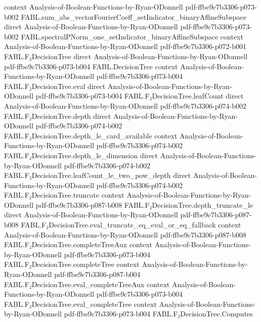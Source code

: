 \begin{theorem}
  {context}
  {Analysis-of-Boolean-Functions-by-Ryan-ODonnell}
  {pdf-ffbe9c7b3306-p073-b002}
\proofstep
  {FABL.sum_abs_vectorFourierCoeff_setIndicator_binaryAffineSubspace}
  {direct}
  {Analysis-of-Boolean-Functions-by-Ryan-ODonnell}
  {pdf-ffbe9c7b3306-p073-b002}
\proofstep
  {FABL.spectralPNorm_one_setIndicator_binaryAffineSubspace}
  {context}
  {Analysis-of-Boolean-Functions-by-Ryan-ODonnell}
  {pdf-ffbe9c7b3306-p072-b001}
\proofstep
  {FABL.F₂DecisionTree}
  {direct}
  {Analysis-of-Boolean-Functions-by-Ryan-ODonnell}
  {pdf-ffbe9c7b3306-p073-b004}
\proofstep
  {FABL.DecisionTree}
  {context}
  {Analysis-of-Boolean-Functions-by-Ryan-ODonnell}
  {pdf-ffbe9c7b3306-p073-b004}
\proofstep
  {FABL.F₂DecisionTree.eval}
  {direct}
  {Analysis-of-Boolean-Functions-by-Ryan-ODonnell}
  {pdf-ffbe9c7b3306-p073-b004}
\proofstep
  {FABL.F₂DecisionTree.leafCount}
  {direct}
  {Analysis-of-Boolean-Functions-by-Ryan-ODonnell}
  {pdf-ffbe9c7b3306-p074-b002}
\proofstep
  {FABL.F₂DecisionTree.depth}
  {direct}
  {Analysis-of-Boolean-Functions-by-Ryan-ODonnell}
  {pdf-ffbe9c7b3306-p074-b002}
\proofstep
  {FABL.F₂DecisionTree.depth_le_card_available}
  {context}
  {Analysis-of-Boolean-Functions-by-Ryan-ODonnell}
  {pdf-ffbe9c7b3306-p074-b002}
\proofstep
  {FABL.F₂DecisionTree.depth_le_dimension}
  {direct}
  {Analysis-of-Boolean-Functions-by-Ryan-ODonnell}
  {pdf-ffbe9c7b3306-p074-b002}
\proofstep
  {FABL.F₂DecisionTree.leafCount_le_two_pow_depth}
  {direct}
  {Analysis-of-Boolean-Functions-by-Ryan-ODonnell}
  {pdf-ffbe9c7b3306-p074-b002}
\proofstep
  {FABL.F₂DecisionTree.truncate}
  {context}
  {Analysis-of-Boolean-Functions-by-Ryan-ODonnell}
  {pdf-ffbe9c7b3306-p087-b008}
\proofstep
  {FABL.F₂DecisionTree.depth_truncate_le}
  {direct}
  {Analysis-of-Boolean-Functions-by-Ryan-ODonnell}
  {pdf-ffbe9c7b3306-p087-b008}
\proofstep
  {FABL.F₂DecisionTree.eval_truncate_eq_eval_or_eq_fallback}
  {context}
  {Analysis-of-Boolean-Functions-by-Ryan-ODonnell}
  {pdf-ffbe9c7b3306-p087-b008}
\proofstep
  {FABL.F₂DecisionTree.completeTreeAux}
  {context}
  {Analysis-of-Boolean-Functions-by-Ryan-ODonnell}
  {pdf-ffbe9c7b3306-p073-b004}
\proofstep
  {FABL.F₂DecisionTree.completeTree}
  {context}
  {Analysis-of-Boolean-Functions-by-Ryan-ODonnell}
  {pdf-ffbe9c7b3306-p087-b004}
\proofstep
  {FABL.F₂DecisionTree.eval_completeTreeAux}
  {context}
  {Analysis-of-Boolean-Functions-by-Ryan-ODonnell}
  {pdf-ffbe9c7b3306-p073-b004}
\proofstep
  {FABL.F₂DecisionTree.eval_completeTree}
  {context}
  {Analysis-of-Boolean-Functions-by-Ryan-ODonnell}
  {pdf-ffbe9c7b3306-p073-b004}
\proofstep
  {FABL.F₂DecisionTree.Computes}

\end{theorem}
